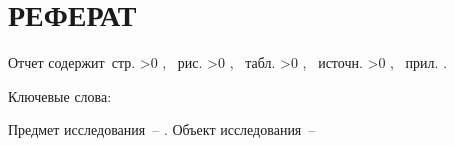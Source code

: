 \chapter{РЕФЕРАТ}%

Отчет содержит \pageref{LastPage}\,стр.%
\ifnum \totfig >0
, \totfig~рис.%
\fi
\ifnum \tottab >0
, \tottab~табл.%
\fi
%
\ifnum \totbib >0
, \totbib~источн.%
\fi
%
\ifnum \totapp >0
, \totapp~прил.%
\else
.%
\fi


Ключевые слова:

Предмет исследования~-- .
Объект исследования~--



